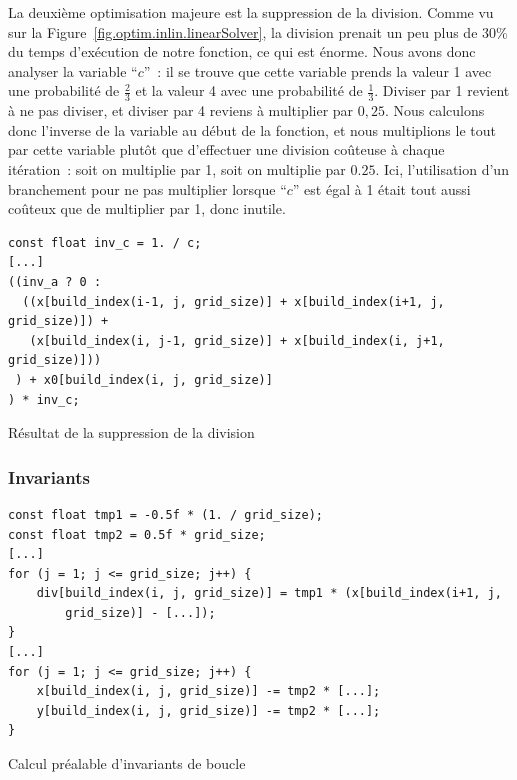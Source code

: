 \documentclass[12pt,a4paper]{article}
\begin{document}
La deuxième optimisation majeure est la suppression de la division. Comme vu sur
la Figure~\ref{fig.optim.inlin.linearSolver}, la division prenait un peu plus de
$30\%$ du temps d’exécution de notre fonction, ce qui est énorme. Nous avons
donc analyser la variable \enquote{$c$} : il se trouve que cette variable prends
la valeur 1 avec une probabilité de $\frac{2}{3}$ et la valeur 4 avec une
probabilité de $\frac{1}{3}$. Diviser par 1 revient à ne pas diviser, et diviser
par 4 reviens à multiplier par $0,25$. Nous calculons donc l’inverse de la
variable au début de la fonction, et nous multiplions le tout par cette variable
plutôt que d’effectuer une division coûteuse à chaque itération : soit on
multiplie par 1, soit on multiplie par $0.25$. Ici, l’utilisation d’un
branchement pour ne pas multiplier lorsque \enquote{$c$} est égal à 1 était tout
aussi coûteux que de multiplier par 1, donc inutile.

\begin{listing}
    \begin{verbatim}
const float inv_c = 1. / c;
[...]
((inv_a ? 0 :
  ((x[build_index(i-1, j, grid_size)] + x[build_index(i+1, j, grid_size)]) +
   (x[build_index(i, j-1, grid_size)] + x[build_index(i, j+1, grid_size)]))
 ) + x0[build_index(i, j, grid_size)]
) * inv_c;
    \end{verbatim}
    \caption{Résultat de la suppression de la division}
    \label{lst.optim.calc.div}
\end{listing}

\subsubsection{Invariants}
\label{sub.optim.calc.inv}

\begin{listing}
    \begin{verbatim}
const float tmp1 = -0.5f * (1. / grid_size);
const float tmp2 = 0.5f * grid_size;
[...]
for (j = 1; j <= grid_size; j++) {
    div[build_index(i, j, grid_size)] = tmp1 * (x[build_index(i+1, j,
        grid_size)] - [...]);
}
[...]
for (j = 1; j <= grid_size; j++) {
    x[build_index(i, j, grid_size)] -= tmp2 * [...];
    y[build_index(i, j, grid_size)] -= tmp2 * [...];
}
    \end{verbatim}
    \caption{Calcul préalable d'invariants de boucle}
    \label{lst.optim.calc.inv}
\end{listing}
\end{document}
